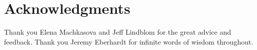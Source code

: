 \documentclass{sig-alternate}
\begin{document}
\section*{Acknowledgments}
\label{sec:acknowledgments}


Thank you Elena Machkasova and Jeff Lindblom for the great advice and feedback.
Thank you Jeremy Eberhardt for infinite words of wisdom throughout.



  
\end{document}
